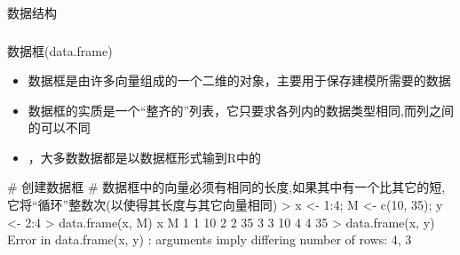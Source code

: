 \begin{frame}[t,fragile]{\subsecname}{数据结构}
  \frametitle{}{数据框(data.frame)}
  \begin{itemize}
  \item 数据框是由许多向量组成的一个二维的对象，主要用于保存建模所需要的数据
  \item 数据框的实质是一个“整齐的”列表，它只要求各列内的数据类型相同,而列之间的可以不同
  \item {}，大多数数据都是以数据框形式输到R中的
  \end{itemize}  

\begin{rcode}
# 创建数据框
# 数据框中的向量必须有相同的长度,如果其中有一个比其它的短,它将“循环”整数次(以使得其长度与其它向量相同)
> x <- 1:4; M <- c(10, 35); y <- 2:4
> data.frame(x, M)
  x  M
1 1 10
2 2 35
3 3 10
4 4 35
> data.frame(x, y)
Error in data.frame(x, y) :
   arguments imply differing number of rows: 4, 3
\end{rcode}  
\end{frame}

